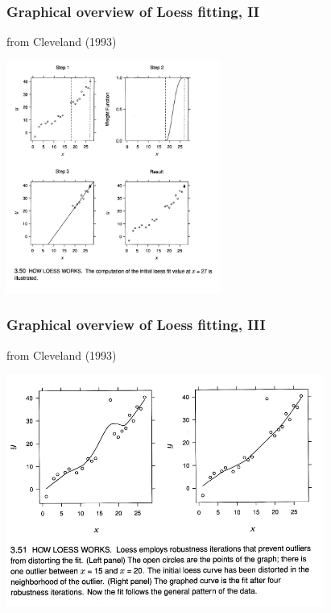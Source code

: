 \documentclass{beamer}
\begin{document}
\begin{frame}
  \frametitle{Graphical overview of Loess fitting, II}  

{\tiny from Cleveland (1993)}
\begin{center}
\includegraphics[height=3in]{loess2.pdf}
\end{center}  

\end{frame}

\begin{frame}
  \frametitle{Graphical overview of Loess fitting, III}  

{\tiny from Cleveland (1993)}
\begin{center}
\includegraphics[height=3in]{loess3.pdf}
\end{center}  

\end{frame}
\end{document}
